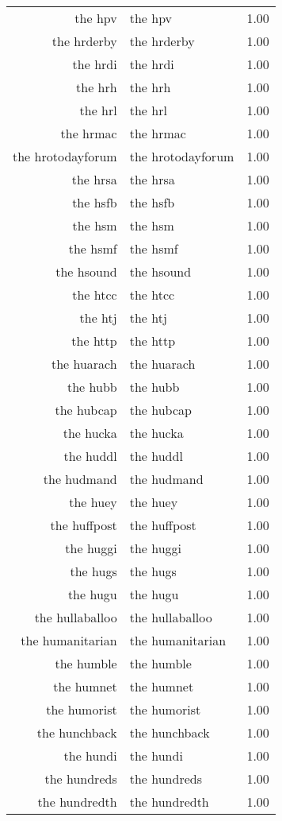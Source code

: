 \begin{table}[ht]
\begin{tabular}{rlr}
  the hpv & the hpv & 1.00 \\ 
  the hrderby & the hrderby & 1.00 \\ 
  the hrdi & the hrdi & 1.00 \\ 
  the hrh & the hrh & 1.00 \\ 
  the hrl & the hrl & 1.00 \\ 
  the hrmac & the hrmac & 1.00 \\ 
  the hrotodayforum & the hrotodayforum & 1.00 \\ 
  the hrsa & the hrsa & 1.00 \\ 
  the hsfb & the hsfb & 1.00 \\ 
  the hsm & the hsm & 1.00 \\ 
  the hsmf & the hsmf & 1.00 \\ 
  the hsound & the hsound & 1.00 \\ 
  the htcc & the htcc & 1.00 \\ 
  the htj & the htj & 1.00 \\ 
  the http & the http & 1.00 \\ 
  the huarach & the huarach & 1.00 \\ 
  the hubb & the hubb & 1.00 \\ 
  the hubcap & the hubcap & 1.00 \\ 
  the hucka & the hucka & 1.00 \\ 
  the huddl & the huddl & 1.00 \\ 
  the hudmand & the hudmand & 1.00 \\ 
  the huey & the huey & 1.00 \\ 
  the huffpost & the huffpost & 1.00 \\ 
  the huggi & the huggi & 1.00 \\ 
  the hugs & the hugs & 1.00 \\ 
  the hugu & the hugu & 1.00 \\ 
  the hullaballoo & the hullaballoo & 1.00 \\ 
  the humanitarian & the humanitarian & 1.00 \\ 
  the humble & the humble & 1.00 \\ 
  the humnet & the humnet & 1.00 \\ 
  the humorist & the humorist & 1.00 \\ 
  the hunchback & the hunchback & 1.00 \\ 
  the hundi & the hundi & 1.00 \\ 
  the hundreds & the hundreds & 1.00 \\ 
  the hundredth & the hundredth & 1.00 \\ 

\end{tabular}
\end{table}
